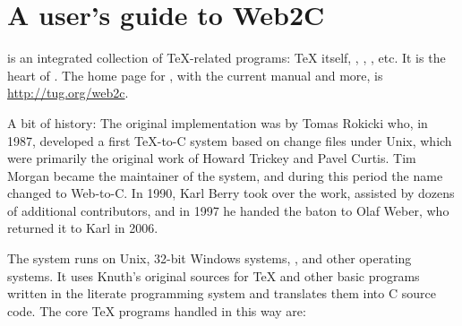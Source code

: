 \documentclass{article}
\begin{document}
\section{A user's guide to Web2C}

\Webc{} is an integrated collection of \TeX-related programs: \TeX{}
itself, \MF{}, \MP, \BibTeX{}, etc.  It is the heart of \TL{}.  The home
page for \Webc{}, with the current manual and more, is
\url{http://tug.org/web2c}.

A bit of history: The original implementation was by Tomas Rokicki who,
in 1987, developed a first \TeX{}-to-C system based on change files
under Unix, which were primarily the original work of Howard Trickey and
Pavel Curtis.  Tim Morgan became the maintainer of the system, and
during this period the name changed to Web-to-C\@.  In 1990, Karl Berry
took over the work, assisted by dozens of additional contributors, and
in 1997 he handed the baton to Olaf Weber, who returned it to Karl in
2006.

The \Webc{} system runs on Unix, 32-bit Windows systems, \MacOSX{}, and
other operating systems. It uses Knuth's original sources for \TeX{} and
other basic programs written in the \web{} literate programming system
and translates them into C source code.  The core \TeX{} programs
handled in this way are:
\end{document}
